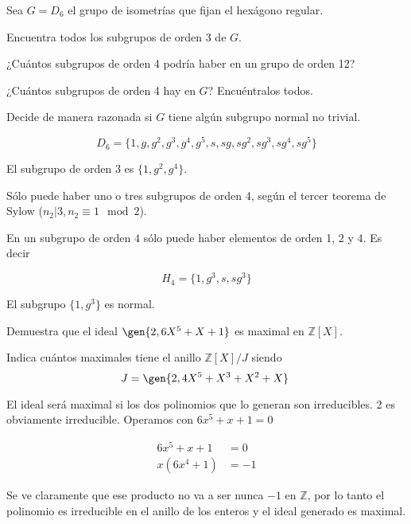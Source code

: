 \begin{problem} Sea $G=D_6$ el grupo de isometrías que fijan el hexágono regular.

\ppart Encuentra todos los subgrupos de orden 3 de $G$.

\ppart ¿Cuántos subgrupos de orden 4 podría haber en un grupo de orden 12?

\ppart ¿Cuántos subgrupos de orden 4 hay en $G$? Encuéntralos todos.

\ppart Decide de manera razonada si $G$ tiene algún subgrupo normal no trivial.

\solution

\[ D_6 = \{ 1, g, g^2, g^3, g^4, g^5, s, sg, sg^2, sg^3, sg^4, sg^5 \} \]

\spart El subgrupo de orden $3$ es $\{ 1, g^2, g^4 \}$.

\spart Sólo puede haber uno o tres subgrupos de orden 4, según el tercer teorema de Sylow ($n_2|3, n_2\equiv 1 \mod 2$). 

\spart En un subgrupo de orden $4$ sólo puede haber elementos de orden 1, 2 y 4. Es decir

\[ H_4 = \{ 1, g^3, s, sg^3 \}  \]

\spart El subgrupo $\{1, g^3\}$ es normal.

\end{problem}

\begin{problem} 

\ppart Demuestra que el ideal $\gen{2,6X^5+X+1}$ es maximal en $ℤ[X]$.

\ppart Indica cuántos maximales tiene el anillo $ℤ[X]/J$ siendo \[ J = \gen{2, 4X^5 +X^3 + X^2 + X} \]

\solution

\spart El ideal será maximal si los dos polinomios que lo generan son irreducibles. 2 es obviamente irreducible. Operamos con $6x^5 + x + 1 = 0$

\begin{align*}
6x^5 + x + 1 &= 0 \\
x(6x^4 + 1)  &= -1
\end{align*}

Se ve claramente que ese producto no va a ser nunca $-1$ en $ℤ$, por lo tanto el polinomio es irreducible en el anillo de los enteros y el ideal generado es maximal.

\spart 

\end{problem}
